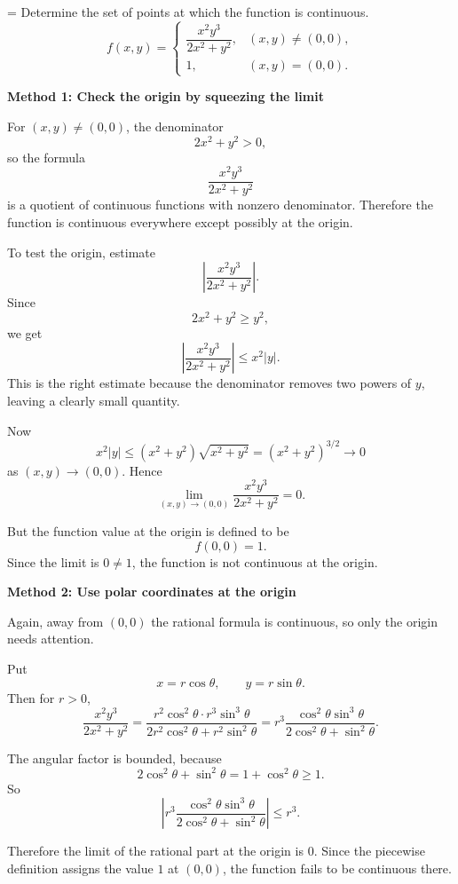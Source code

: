 \documentclass[a4paper,12pt,twocolumn]{article}
\newlength{\problemnumberwidth}
\newenvironment{solutionbox}{\begin{framed}}{\end{framed}}
\newcommand{\problem}[3]{%
  \Needspace{10\baselineskip}%
  \phantomsection\label{#1}%
  \par\vspace{0.8em}%
  \noindent
  \hangindent=\problemnumberwidth
  \hangafter=1
  \makebox[\problemnumberwidth][l]{\textbf{#2.}}#3\par
}
\begin{document}
\problem{prob:14-2-49}{49}{Determine the set of points at which the function is continuous.
\[
f(x,y)=
\begin{cases}
\dfrac{x^2y^3}{2x^2+y^2}, & (x,y)\ne(0,0), \\
1, & (x,y)=(0,0).
\end{cases}
\]}

\begin{solutionbox}
\textbf{Method 1: Check the origin by squeezing the limit}

\begin{steps}
\item For \((x,y)\ne(0,0)\), the denominator
\[
2x^2+y^2>0,
\]
so the formula
\[
\frac{x^2y^3}{2x^2+y^2}
\]
is a quotient of continuous functions with nonzero denominator. Therefore the function is continuous everywhere except possibly at the origin.

\item To test the origin, estimate
\[
\left|\frac{x^2y^3}{2x^2+y^2}\right|.
\]
Since
\[
2x^2+y^2\ge y^2,
\]
we get
\[
\left|\frac{x^2y^3}{2x^2+y^2}\right|
\le
x^2|y|.
\]
This is the right estimate because the denominator removes two powers of \(y\), leaving a clearly small quantity.

\item Now
\[
x^2|y|
\le
(x^2+y^2)\sqrt{x^2+y^2}
=(x^2+y^2)^{3/2}\to 0
\]
as \((x,y)\to(0,0)\). Hence
\[
\lim_{(x,y)\to(0,0)} \frac{x^2y^3}{2x^2+y^2}=0.
\]

\item But the function value at the origin is defined to be
\[
f(0,0)=1.
\]
Since the limit is \(0\ne 1\), the function is not continuous at the origin.
\end{steps}
\end{solutionbox}

\begin{solutionbox}
\textbf{Method 2: Use polar coordinates at the origin}

\begin{steps}
\item Again, away from \((0,0)\) the rational formula is continuous, so only the origin needs attention.

\item Put
\[
x=r\cos\theta,\qquad y=r\sin\theta.
\]
Then for \(r>0\),
\[
\frac{x^2y^3}{2x^2+y^2}
=
\frac{r^2\cos^2\theta\cdot r^3\sin^3\theta}{2r^2\cos^2\theta+r^2\sin^2\theta}
=
r^3\frac{\cos^2\theta\sin^3\theta}{2\cos^2\theta+\sin^2\theta}.
\]

\item The angular factor is bounded, because
\[
2\cos^2\theta+\sin^2\theta=1+\cos^2\theta\ge 1.
\]
So
\[
\left|r^3\frac{\cos^2\theta\sin^3\theta}{2\cos^2\theta+\sin^2\theta}\right|
\le r^3.
\]

\item Therefore the limit of the rational part at the origin is \(0\). Since the piecewise definition assigns the value \(1\) at \((0,0)\), the function fails to be continuous there.
\end{steps}
\end{solutionbox}
\end{document}
